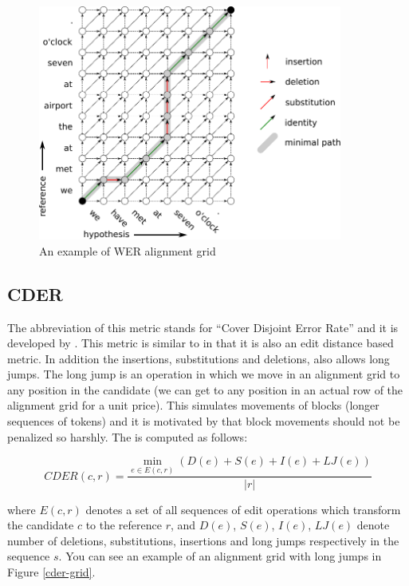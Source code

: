 \begin{figure}
    \begin{center}
        \includegraphics[width=10cm]{img/wer-grid.pdf}
    \end{center}

    \caption{An example of WER alignment grid}
    \label{wer-grid}
\end{figure}

\subsection{CDER}

The abbreviation of this metric stands for ``Cover Disjoint Error Rate'' and it
is developed by . This metric is similar to
 in that it is also an edit distance based metric. In addition the
insertions, substitutions and deletions,  also allows long jumps.
The long jump is an operation in which we move in an alignment grid to any
position in the candidate (we can get to any position in an actual row of the
alignment grid for a unit price). This simulates movements of blocks (longer
sequences of tokens) and it is motivated by that block movements should not be
penalized so harshly. The  is computed as follows:

\begin{equation*}
    CDER(c,r) = \frac{
        \min_{e \in E(c,r)} \left( D(e) + S(e) + I(e) + LJ(e) \right)
    }{
        |r|
    }
\end{equation*}

\noindent where $E(c,r)$ denotes a set of all sequences of edit operations
which transform the candidate $c$ to the reference $r$, and $D(e)$, $S(e)$,
$I(e)$, $LJ(e)$ denote number of deletions, substitutions, insertions and long
jumps respectively in the sequence $s$. You can see an example of an alignment grid with
long jumps in Figure \ref{cder-grid}.

